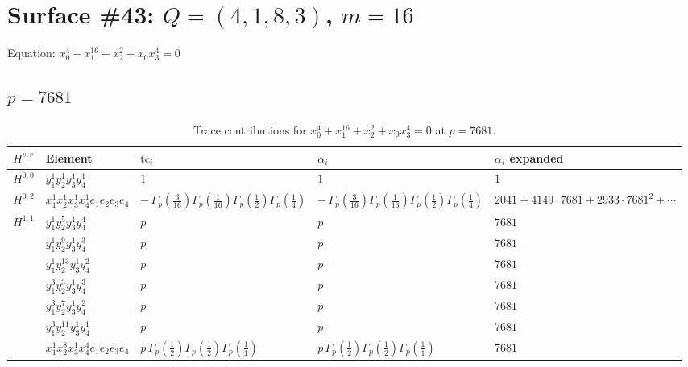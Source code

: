 \documentclass[11pt]{article}
\begin{document}
\newpage

\section*{Surface \#43: $Q=(4, 1, 8, 3)$, $m=16$}

Equation: $x_0^{4} + x_1^{16} + x_2^{2} + x_0 x_3^{4} = 0$

\subsection*{$p = 7681$}

\begin{table}[ht]
\centering
\caption{Trace contributions for $x_0^{4} + x_1^{16} + x_2^{2} + x_0 x_3^{4} = 0$ at $p=7681$.}\label{tab:deformed-43}
\renewcommand{\arraystretch}{1.1}
{\scriptsize
\begin{tabular}{@{}lllll@{}}
\toprule
$H^{s,r}$ & Element & $\mathrm{tc}_i$ & $\alpha_i$ & $\alpha_i$ expanded \\
\midrule
$H^{0,0}$ & $y_{1}^{1} y_{2}^{1} y_{3}^{1} y_{4}^{1}$ & $1$ & $1$ & $1$ \\
\midrule
$H^{0,2}$ & $x_{1}^{1} x_{2}^{1} x_{3}^{1} x_{4}^{1}  e_{1} e_{2} e_{3} e_{4}$ & $- \, \Gamma_p \left( \frac{3}{16} \right) \Gamma_p \left( \frac{1}{16} \right) \Gamma_p \left( \frac{1}{2} \right) \Gamma_p \left( \frac{1}{4} \right)$ & $- \, \Gamma_p \left( \frac{3}{16} \right) \Gamma_p \left( \frac{1}{16} \right) \Gamma_p \left( \frac{1}{2} \right) \Gamma_p \left( \frac{1}{4} \right)$ & $2041{+}4149{\cdot}7681{+}2933{\cdot}7681^{2}{+}\cdots$ \\
\midrule
$H^{1,1}$ & $y_{1}^{1} y_{2}^{5} y_{3}^{1} y_{4}^{4}$ & $p \,$ & $p \,$ & $7681$ \\
 & $y_{1}^{1} y_{2}^{9} y_{3}^{1} y_{4}^{3}$ & $p \,$ & $p \,$ & $7681$ \\
 & $y_{1}^{1} y_{2}^{13} y_{3}^{1} y_{4}^{2}$ & $p \,$ & $p \,$ & $7681$ \\
 & $y_{1}^{3} y_{2}^{3} y_{3}^{1} y_{4}^{3}$ & $p \,$ & $p \,$ & $7681$ \\
 & $y_{1}^{3} y_{2}^{7} y_{3}^{1} y_{4}^{2}$ & $p \,$ & $p \,$ & $7681$ \\
 & $y_{1}^{3} y_{2}^{11} y_{3}^{1} y_{4}^{1}$ & $p \,$ & $p \,$ & $7681$ \\
 & $x_{1}^{1} x_{2}^{8} x_{3}^{1} x_{4}^{4}  e_{1} e_{2} e_{3} e_{4}$ & $p \, \Gamma_p \left( \frac{1}{2} \right) \Gamma_p \left( \frac{1}{2} \right) \Gamma_p \left( \frac{1}{1} \right)$ & $p \, \Gamma_p \left( \frac{1}{2} \right) \Gamma_p \left( \frac{1}{2} \right) \Gamma_p \left( \frac{1}{1} \right)$ & $7681$ \\

\end{tabular}}
\end{table}
\end{document}

